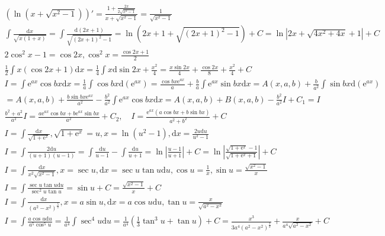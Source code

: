 \documentclass{article}
\begin{document}
\clearpage 

\begin{align*}
    (\ln(x+\sqrt{x^2-1}))' = \frac{1+\frac{2x}{2\sqrt{x^2-1}}}{x+\sqrt{x^2-1}}= \frac{1}{\sqrt{x^2-1}} \\
    \int \frac{\mathrm{d}x}{\sqrt{x(1+x)}} = \int \frac{\mathrm{d}(2x+1)}{\sqrt{\left(2x+1\right)^2-1}} = \ln(2x+1+\sqrt{(2x+1)^2 - 1}) + C = \ln |2x+\sqrt{4x^2+4x}+1| + C \\
    2\cos^2 x - 1 = \cos 2x,\cos^2 x = \frac{\cos 2x + 1}{2} \\
    \frac{1}{2} \int x(\cos 2x + 1)\mathrm{d}x = \frac{1}{4} \int x \mathrm{d}\sin 2x + \frac{x^2}{4} = \frac{x\sin 2x}{4} + \frac{\cos 2x}{8} + \frac{x^2}{4} + C \\
    I = \int \mathrm{e}^{ax} \cos bx \mathrm{d}x = \frac{1}{a} \int\cos bx \mathrm{d}(\mathrm{e}^{ax}) = \frac{\cos bx \mathrm{e}^{ax}}{a} + \frac{b}{a}\int \mathrm{e}^{ax}\sin bx \mathrm{d}x = A(x,a,b) + \frac{b}{a^2} \int \sin bx \mathrm{d}(\mathrm{e}^{ax})\\
    = A(x,a,b) + \frac{b\sin bx \mathrm{e}^{ax}}{a^2} - \frac{b^2}{a^2}\int \mathrm{e}^{ax}\cos bx \mathrm{d}x = A(x,a,b) + B(x,a,b) - \frac{b^2}{a^2}I + C_{1} = I \\ 
    \frac{b^2+a^2}{a^2} I = \frac{a \mathrm{e}^{ax} \cos bx + b \mathrm{e}^{ax}\sin bx}{a^2} + C_{2} , \quad I = \frac{\mathrm{e}^{ax}(a\cos bx + b\sin bx)}{a^2+b^2} + C\\
    I = \int \frac{\mathrm{d}x}{\sqrt{1+\mathrm{e}^{x}}} , \sqrt{1+\mathrm{e}^{x}} = u , x = \ln(u^2-1) , \mathrm{d}x = \frac{2u\mathrm{d}u}{u^2-1} \\
    I = \int \frac{2\mathrm{d}u}{(u+1)(u-1)} = \int \frac{\mathrm{d}u}{u-1} - \int \frac{\mathrm{d}u}{u+1} = \ln\left| \frac{u-1}{u+1} \right| + C  = \ln \left| \frac{\sqrt{1+\mathrm{e}^{x}}-1}{\sqrt{1+\mathrm{e}^{x}+1}} \right| + C\\
    I = \int \frac{\mathrm{d}x}{x^2\sqrt{x^2-1}} , x = \sec u , \mathrm{d}x = \sec u \tan u \mathrm{d}u , \cos u = \frac{1}{x} , \sin u = \frac{\sqrt{x^2-1}}{x}\\
    I = \int \frac{\sec u \tan u \mathrm{d}u}{\sec^2 u \tan u} = \sin u + C = \frac{\sqrt{x^2-1}}{x} + C \\ 
    I = \int \frac{\mathrm{d}x}{(a^2-x^2)^{\frac{5}{2}}} , x = a\sin u , \mathrm{d}x = a\cos u \mathrm{d}u , \tan u = \frac{x}{\sqrt{a^2-x^2}}\\
    I = \int \frac{a\cos u\mathrm{d}u}{a^5\cos^5 u} = \frac{1}{a^4} \int \sec^4 u \mathrm{d}u = \frac{1}{a^4}\left(\frac{1}{3}\tan^3 u + \tan u\right) + C = \frac{x^3}{3a^4(a^2-x^2)^{\frac{3}{2}}} + \frac{x}{a^4\sqrt{a^2-x^2}} + C \\

\end{align*}
\end{document}
